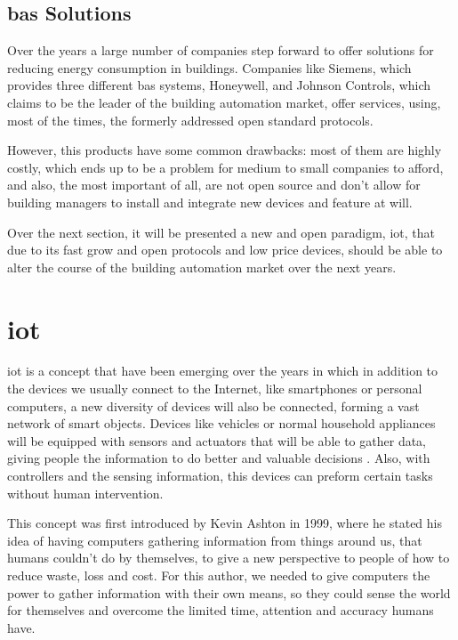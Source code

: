 \subsection{\ac{bas} Solutions}

Over the years a large number of companies step forward to offer solutions for reducing energy consumption in buildings. Companies like Siemens, which provides three different \ac{bas} systems, Honeywell, and Johnson Controls, which claims to be the leader of the building automation market, offer services, using, most of the times, the formerly addressed open standard protocols.

However, this products have some common drawbacks: most of them are highly costly, which ends up to be a problem for medium to small companies to afford, and also, the most important of all, are not open source and don't allow for building managers to install and integrate new devices and feature at will. 

Over the next section, it will be presented a new and open paradigm, \acf{iot}, that due to its fast grow and open protocols and low price devices, should be able to alter the course of the building automation market over the next years.

\section{\acf{iot}}

\acf{iot} is a concept that have been emerging over the years in which in addition to the devices we usually connect to the Internet, like smartphones or personal computers, a new diversity of devices will also be connected, forming a vast network of smart objects. Devices like vehicles or normal household appliances will be equipped with sensors and actuators that will be able to gather data, giving people the information to do better and valuable decisions \cite{Weiser1991}. Also, with controllers and the sensing information, this devices can preform certain tasks without human intervention.

This concept was first introduced by Kevin Ashton \cite{Ashton} in 1999, where he stated his idea of having computers gathering information from things around us, that humans couldn't do by themselves, to give a new perspective to people of how to reduce waste, loss and cost. For this author, we needed to give computers the power to gather information with their own means, so they could sense the world for themselves and overcome the limited time, attention and accuracy humans have.

